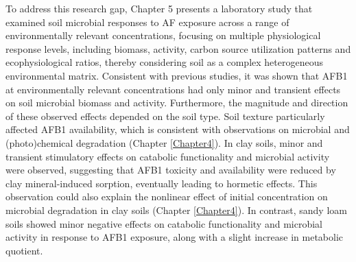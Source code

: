 To address this research gap, Chapter 5 presents a laboratory study that examined soil microbial responses to AF exposure across a range of environmentally relevant concentrations, focusing on multiple physiological response levels, including biomass, activity, carbon source utilization patterns and ecophysiological ratios, thereby considering soil as a complex heterogeneous environmental matrix.  Consistent with previous studies, it was shown that AFB1 at environmentally relevant concentrations had only minor and transient effects on soil microbial biomass and activity. Furthermore, the magnitude and direction of these observed effects depended on the soil type. Soil texture particularly affected AFB1 availability, which is consistent with observations on microbial and (photo)chemical degradation (Chapter \ref{Chapter4}). In clay soils, minor and transient stimulatory effects on catabolic functionality and microbial activity were observed, suggesting that AFB1 toxicity and availability were reduced by clay mineral-induced sorption, eventually leading to hormetic effects. This observation could also explain the nonlinear effect of initial concentration on microbial degradation in clay soils (Chapter \ref{Chapter4}). In contrast, sandy loam soils showed minor negative effects on catabolic functionality and microbial activity in response to AFB1 exposure, along with a slight increase in metabolic quotient.


